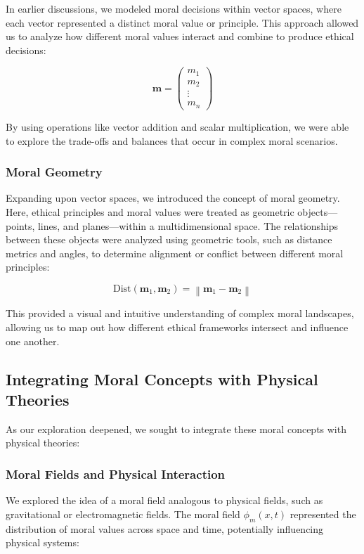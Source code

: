 \documentclass{article}
\begin{document}
In earlier discussions, we modeled moral decisions within vector spaces, where each vector represented a distinct moral value or principle. This approach allowed us to analyze how different moral values interact and combine to produce ethical decisions:

\[
\mathbf{m} = \begin{pmatrix}
m_1 \\
m_2 \\
\vdots \\
m_n
\end{pmatrix}
\]

By using operations like vector addition and scalar multiplication, we were able to explore the trade-offs and balances that occur in complex moral scenarios.

\subsubsection{Moral Geometry}

Expanding upon vector spaces, we introduced the concept of moral geometry. Here, ethical principles and moral values were treated as geometric objects—points, lines, and planes—within a multidimensional space. The relationships between these objects were analyzed using geometric tools, such as distance metrics and angles, to determine alignment or conflict between different moral principles:

\[
\text{Dist}(\mathbf{m}_1, \mathbf{m}_2) = \left\lVert \mathbf{m}_1 - \mathbf{m}_2 \right\rVert
\]

This provided a visual and intuitive understanding of complex moral landscapes, allowing us to map out how different ethical frameworks intersect and influence one another.

\subsection{Integrating Moral Concepts with Physical Theories}

As our exploration deepened, we sought to integrate these moral concepts with physical theories:

\subsubsection{Moral Fields and Physical Interaction}

We explored the idea of a moral field analogous to physical fields, such as gravitational or electromagnetic fields. The moral field \( \phi_m(x, t) \) represented the distribution of moral values across space and time, potentially influencing physical systems:
\end{document}
